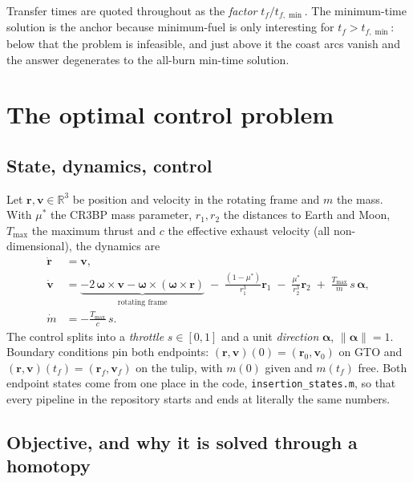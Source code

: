 \documentclass[11pt]{article}
\newcommand{\vect}[1]{\bm{#1}}
\newcommand{\file}[1]{\texttt{#1}}
\begin{document}
Transfer times are quoted throughout as the \emph{factor} $t_f/t_{f,\min}$.
The minimum-time solution is the anchor because minimum-fuel is only
interesting for $t_f>t_{f,\min}$: below that the problem is infeasible, and
just above it the coast arcs vanish and the answer degenerates to the
all-burn min-time solution.

\section{The optimal control problem}

\subsection{State, dynamics, control}

Let $\vect{r},\vect{v}\in\mathbb{R}^3$ be position and velocity in the rotating
frame and $m$ the mass. With $\mu^\ast$ the CR3BP mass parameter, $r_1,r_2$ the
distances to Earth and Moon, $T_{\max}$ the maximum thrust and $c$ the
effective exhaust velocity (all non-dimensional), the dynamics are
\begin{align}
\dot{\vect{r}} &= \vect{v}, \\
\dot{\vect{v}} &= \underbrace{-2\,\vect{\omega}\times\vect{v}
   - \vect{\omega}\times(\vect{\omega}\times\vect{r})}_{\text{rotating frame}}
   \;-\;\frac{(1-\mu^\ast)}{r_1^3}\vect{r}_1
   \;-\;\frac{\mu^\ast}{r_2^3}\vect{r}_2
   \;+\;\frac{T_{\max}}{m}\,s\,\vect{\alpha}, \\
\dot{m} &= -\frac{T_{\max}}{c}\,s .
\end{align}
The control splits into a \emph{throttle} $s\in[0,1]$ and a unit
\emph{direction} $\vect{\alpha}$, $\|\vect{\alpha}\|=1$. Boundary conditions
pin both endpoints: $(\vect{r},\vect{v})(0)=(\vect{r}_0,\vect{v}_0)$ on GTO and
$(\vect{r},\vect{v})(t_f)=(\vect{r}_f,\vect{v}_f)$ on the tulip, with $m(0)$
given and $m(t_f)$ free. Both endpoint states come from one place in the code,
\file{insertion\_states.m}, so that every pipeline in the repository starts and
ends at literally the same numbers.

\subsection{Objective, and why it is solved through a homotopy}
\end{document}
